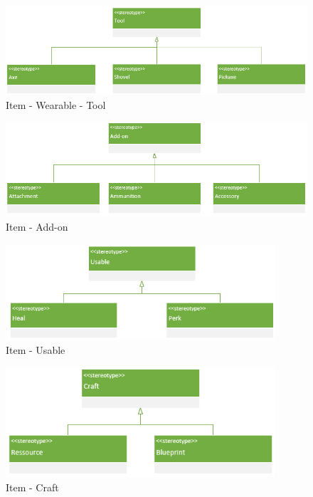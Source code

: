 \begin{figure}[H]
    \begin{center}
    \includegraphics[width=14cm]{10_img/Z_annexeA/item_werable_tool.PNG}
    \caption{Item - Wearable - Tool}
    \label{A-Tool}
    \end{center}
\end{figure}

\begin{figure}[H]
    \begin{center}
    \includegraphics[width=14cm]{10_img/Z_annexeA/item_addon.PNG}
    \caption{Item - Add-on}
    \label{A-Add-on}
    \end{center}
\end{figure}

\begin{figure}[H]
    \begin{center}
    \includegraphics[width=10cm]{10_img/Z_annexeA/item_usable.PNG}
    \caption{Item - Usable}
    \label{A-Usable}
    \end{center}
\end{figure}

\begin{figure}[H]
    \begin{center}
    \includegraphics[width=10cm]{10_img/Z_annexeA/item_craft.PNG}
    \caption{Item - Craft}
    \label{A-Craft}
    \end{center}
\end{figure}

